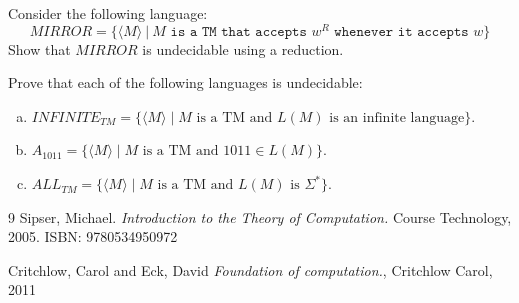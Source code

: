 \documentclass[12pt]{article}
\newenvironment{exercise}[2][Exercise]{\begin{trivlist}
\item[\hskip \labelsep {\bfseries #1}\hskip \labelsep {\bfseries #2.}]}{\end{trivlist}}
\begin{document}
\newpage


\begin{exercise}{3}
Consider the following language: \[MIRROR=\{\langle M\rangle \ | \ M \texttt{ is a TM that accepts } w^R \texttt{ whenever it accepts } w\}\] 
Show that $MIRROR$ is undecidable using a reduction.
\end{exercise}

\newpage

\begin{exercise}{4}
Prove that each of the following languages is undecidable:
\begin{enumerate}[(a)]
\setlength{\itemsep}{10em}
\item $INFINITE_{TM} = \{ \langle M \rangle \; \vert \; M \text{ is a TM and } L(M) \text{ is an infinite language} \} $.


\item $A_{1011} = \{ \langle M \rangle \; \vert \; M \text{ is a TM and } 1011 \in L(M)\} $.


\item $ALL_{TM} = \{ \langle M \rangle \; \vert \; M \text{ is a TM and } L(M) \text{ is }\Sigma^* \} $.


\end{enumerate}
\end{exercise}



\vfill
\begin{thebibliography}{9}
Sipser, Michael. 
\textit{Introduction to the Theory of Computation.}
Course Technology, 2005. ISBN: 9780534950972

Critchlow, Carol and Eck, David
\textit{Foundation of computation.},
Critchlow Carol, 2011
\end{thebibliography}


 
\end{document}
